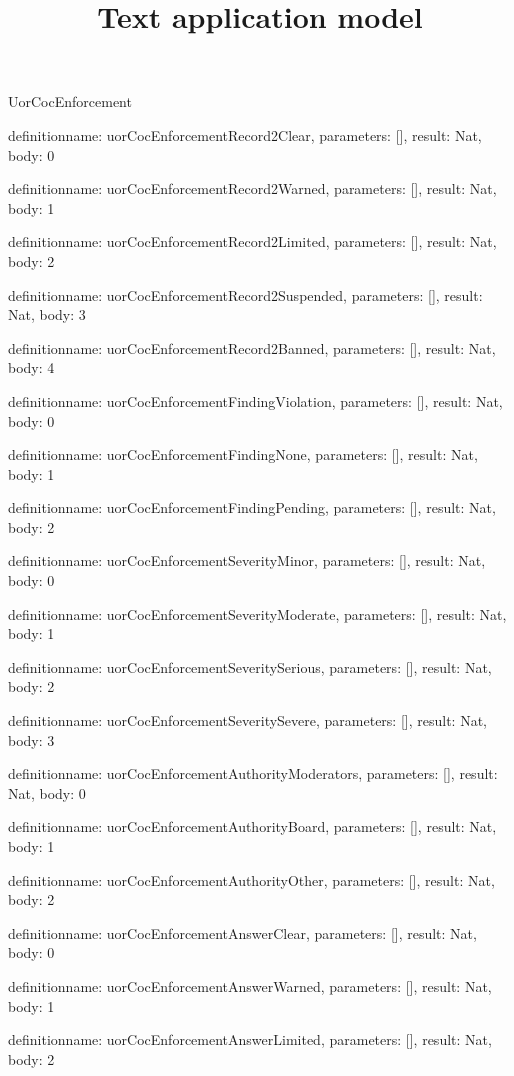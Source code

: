 \begin{lexlean}{UorCocEnforcement}
\title{Text application model}
\begin{semanticmodule}
definition{name: uorCocEnforcementRecord2Clear, parameters: [], result: Nat, body: 0}

definition{name: uorCocEnforcementRecord2Warned, parameters: [], result: Nat, body: 1}

definition{name: uorCocEnforcementRecord2Limited, parameters: [], result: Nat, body: 2}

definition{name: uorCocEnforcementRecord2Suspended, parameters: [], result: Nat, body: 3}

definition{name: uorCocEnforcementRecord2Banned, parameters: [], result: Nat, body: 4}

definition{name: uorCocEnforcementFindingViolation, parameters: [], result: Nat, body: 0}

definition{name: uorCocEnforcementFindingNone, parameters: [], result: Nat, body: 1}

definition{name: uorCocEnforcementFindingPending, parameters: [], result: Nat, body: 2}

definition{name: uorCocEnforcementSeverityMinor, parameters: [], result: Nat, body: 0}

definition{name: uorCocEnforcementSeverityModerate, parameters: [], result: Nat, body: 1}

definition{name: uorCocEnforcementSeveritySerious, parameters: [], result: Nat, body: 2}

definition{name: uorCocEnforcementSeveritySevere, parameters: [], result: Nat, body: 3}

definition{name: uorCocEnforcementAuthorityModerators, parameters: [], result: Nat, body: 0}

definition{name: uorCocEnforcementAuthorityBoard, parameters: [], result: Nat, body: 1}

definition{name: uorCocEnforcementAuthorityOther, parameters: [], result: Nat, body: 2}

definition{name: uorCocEnforcementAnswerClear, parameters: [], result: Nat, body: 0}

definition{name: uorCocEnforcementAnswerWarned, parameters: [], result: Nat, body: 1}

definition{name: uorCocEnforcementAnswerLimited, parameters: [], result: Nat, body: 2}


\end{semanticmodule}
\end{lexlean}
